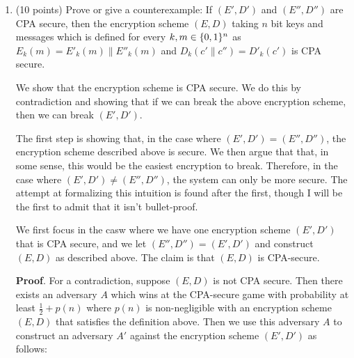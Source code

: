 \documentclass{article}
\begin{document}
\begin{enumerate}[,label=\alph*.]%

\item{}
(10 points) Prove or give a counterexample: If $(E',D')$ and $(E'',D'')$ are CPA secure, then the encryption scheme $(E,D)$ taking $n$ bit keys and messages which is defined for every $k,m\in\{0,1\}^n$ as $E_k(m)=E'_k(m)\|E''_k(m)$ and $D_k(c'\|c'')=D'_k(c')$ is CPA secure.%

We show that the encryption scheme is CPA secure. We do this by contradiction and showing that if we
can break the above encryption scheme, then we can break $(E',D')$.%

The first step is showing that, in the case where $(E',D') = (E'', D'')$, the encryption scheme 
described above is secure. We then argue that that, in some sense, this would be the easiest 
encryption to break. Therefore, in the case where $(E',D') \neq (E'',D'')$, the system can only 
be more secure. The attempt at formalizing this intuition is found after the first, though I will
be the first to admit that it isn't bullet-proof.%

We first focus in the casw where we have one encryption scheme $(E',D')$ that is CPA secure,
and we let $(E'',D'') = (E',D')$ and construct $(E,D)$ as described above. The claim is that $(E,D)$
is CPA-secure.%

\begin{mdbmarginx}{1ex}{0pt}{1ex}{0pt}%
\noindent{}\textbf{Proof}.  For a contradiction, suppose
$(E,D)$ is not CPA secure. Then there exists an adversary $A$ which wins
at the CPA-secure game with probability at least $\frac{1}{2} + p(n)$ where $p(n)$ is non-negligible
with an encryption scheme $(E,D)$ that satisfies the definition above.
Then we use this adversary $A$ to construct an adversary $A'$ against the encryption scheme
$(E',D')$ as follows:%


\end{mdbmarginx}
\end{enumerate}
\end{document}
